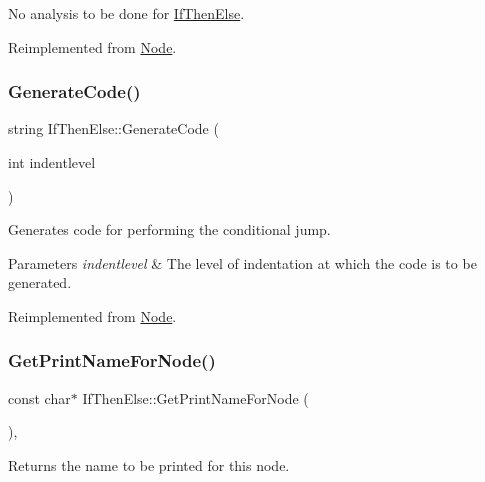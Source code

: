 No analysis to be done for \hyperlink{class_if_then_else}{If\+Then\+Else}. 

Reimplemented from \hyperlink{class_node_a5f88d55c6f253a29def7ccc443d83d47}{Node}.

\mbox{\label{class_if_then_else_adc0bd51e42fed9dd67b67253dd77665a}} 
\subsubsection{\texorpdfstring{Generate\+Code()}{GenerateCode()}}
{\footnotesize\ttfamily string If\+Then\+Else\+::\+Generate\+Code (\begin{DoxyParamCaption}\item[{int}]{indentlevel }\end{DoxyParamCaption})\hspace{0.3cm}{\ttfamily [virtual]}}

Generates code for performing the conditional jump. 
\begin{DoxyParams}{Parameters}
{\em indentlevel} & The level of indentation at which the code is to be generated. \\
\hline
\end{DoxyParams}


Reimplemented from \hyperlink{class_node_acb60e526730e8436056375a3055c2c32}{Node}.

\mbox{\label{class_if_then_else_a6fff2f19c2fc487ca21b2fabb358169e}} 
\subsubsection{\texorpdfstring{Get\+Print\+Name\+For\+Node()}{GetPrintNameForNode()}}
{\footnotesize\ttfamily const char$\ast$ If\+Then\+Else\+::\+Get\+Print\+Name\+For\+Node (\begin{DoxyParamCaption}{ }\end{DoxyParamCaption})\hspace{0.3cm}{\ttfamily [inline]}, {\ttfamily [virtual]}}

Returns the name to be printed for this node. 


